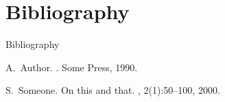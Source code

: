 \documentclass[xcolor=dvipsnames]{beamer}
\begin{document}
\section*{Bibliography}
\begin{frame}{Bibliography}
  \begin{thebibliography}{10}

    A.~Author.
    .
    \newblock Some Press, 1990.

    S.~Someone.
    \newblock On this and that.
    , 2(1):50--100,
    2000.

  \end{thebibliography}
\end{frame}
\end{document}
